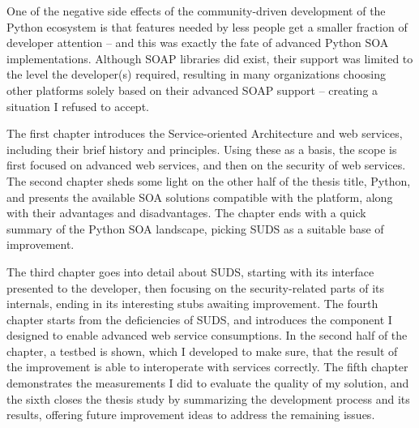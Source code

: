 One of the negative side effects of the community-driven development of the Python ecosystem is that features needed by less people get a smaller fraction of developer attention -- and this was exactly the fate of advanced Python SOA implementations. Although SOAP libraries did exist, their support was limited to the level the developer(s) required, resulting in many organizations choosing other platforms solely based on their advanced SOAP support -- creating a situation I refused to accept.

The first chapter introduces the Service-oriented Architecture and web services, including their brief history and principles. Using these as a basis, the scope is first focused on advanced web services, and then on the security of web services. The second chapter sheds some light on the other half of the thesis title, Python, and presents the available SOA solutions compatible with the platform, along with their advantages and disadvantages. The chapter ends with a quick summary of the Python SOA landscape, picking SUDS as a suitable base of improvement.

The third chapter goes into detail about SUDS, starting with its interface presented to the developer, then focusing on the security-related parts of its internals, ending in its interesting stubs awaiting improvement. The fourth chapter starts from the deficiencies of SUDS, and introduces the component I designed to enable advanced web service consumptions. In the second half of the chapter, a testbed is shown, which I developed to make sure, that the result of the improvement is able to interoperate with services correctly. The fifth chapter demonstrates the measurements I did to evaluate the quality of my solution, and the sixth closes the thesis study by summarizing the development process and its results, offering future improvement ideas to address the remaining issues.
